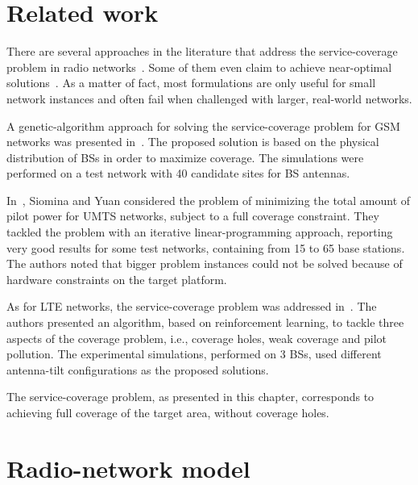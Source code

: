 \section{Related work \label{sec:06-Related-work}}

There are several approaches in the literature that address the service-coverage
problem in radio networks~\cite{Amaldi-Radio_planning_and_coverage_optimization_of_3G_networks:2008,Nawrocki_Understanding:2006,Siomina_Pilot.power.optimization:2004}.
Some of them even claim to achieve near-optimal solutions~\cite{Siomina:Minimum.pilot.power.for.service.coverage}.
As a matter of fact, most formulations are only useful for small network
instances and often fail when challenged with larger, real-world networks.

A genetic-algorithm approach for solving the service-coverage problem
for GSM networks was presented in~\cite{Lieska-Radion_coverage_optimization_with_genetic_algorithms:1998}.
The proposed solution is based on the physical distribution of BSs
in order to maximize coverage. The simulations were performed on a
test network with 40 candidate sites for BS antennas.

In~\cite{Siomina:Minimum.pilot.power.for.service.coverage}, Siomina
and Yuan considered the problem of minimizing the total amount of
pilot power for UMTS networks, subject to a full coverage constraint.
They tackled the problem with an iterative linear-programming approach,
reporting very good results for some test networks, containing from
15 to 65 base stations. The authors noted that bigger problem instances
could not be solved because of hardware constraints on the target
platform.

As for LTE networks, the service-coverage problem was addressed in~\cite{Thampi-A_sparse_sampling_algorithm_for_self_optimisation_of_coverage_in_LTE_networks:2012}.
The authors presented an algorithm, based on reinforcement learning,
to tackle three aspects of the coverage problem, i.e., coverage holes,
weak coverage and pilot pollution. The experimental simulations, performed
on 3 BSs, used different antenna-tilt configurations as the proposed
solutions.

The service-coverage problem, as presented in this chapter, corresponds
to achieving full coverage of the target area, without coverage holes.


\section{Radio-network model \label{sec:06-Radio_network_model}}

